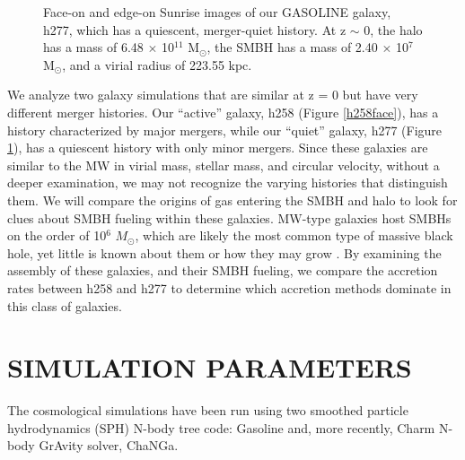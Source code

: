 \documentclass[12pt,headA,chapB]{fiskthesis}
\begin{document}
\begin{figure}[h]
\centerline{}
\caption[GASOLINE h277]{Face-on and edge-on Sunrise images of our GASOLINE galaxy, h277, which has a quiescent, merger-quiet history. At z $\sim$ 0, the halo has a mass of 6.48 $\times$ 10$^{11}$ M$_{\odot}$, the SMBH has a mass of 2.40 $\times$ 10$^7$ M$_{\odot}$, and a virial radius of 223.55 kpc. }
\label{h277face} 
\end{figure}

We analyze two galaxy simulations that are similar at z = 0 but have very different merger histories. Our ``active'' galaxy, h258 (Figure \ref{h258face}), has a history characterized by major mergers, while our ``quiet'' galaxy, h277 (Figure \ref{h277face}), has a quiescent history with only minor mergers. Since these galaxies are similar to the MW in virial mass, stellar mass, and circular velocity, without a deeper examination, we may not recognize the varying histories that distinguish them. We will compare the origins of gas entering the SMBH and halo to look for clues about SMBH fueling within these galaxies. MW-type galaxies host SMBHs on the order of 10$^6$ $M_{\odot}$, which are likely the most common type of massive black hole, yet little is known about them or how they may grow \citep{Kormendy2013}.  By examining the assembly of these galaxies, and their SMBH fueling, we compare the accretion rates between h258 and h277 to determine which accretion methods dominate in this class of galaxies.




\chapter{\normalsize SIMULATION PARAMETERS}
\thispagestyle{empty}

The cosmological simulations have been run using two smoothed particle hydrodynamics (SPH) N-body tree code: Gasoline \citep{Wadsley2004} and, more recently, Charm N-body GrAvity solver, ChaNGa. 
\end{document}

